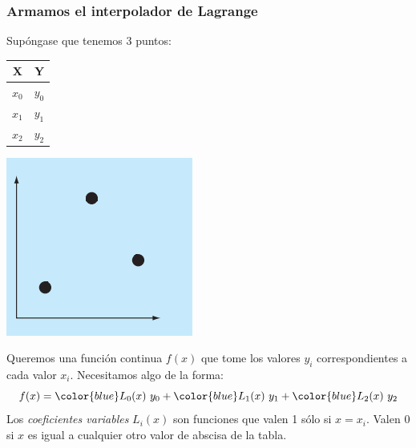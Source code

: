 \documentclass[11pt,xcolor={rgb}]{beamer}
\begin{document}
\begin{frame}[fragile=singleslide]
\frametitle{Armamos el interpolador de Lagrange}

Sup\'ongase que tenemos 3 puntos:

\begin{center}
\begin{multicols}{2}

	\begin{tabular}{c|c}
	X & Y\\	
	\hline
	$x_0$ & $y_0$\\
	$x_1$ & $y_1$\\
	$x_2$ & $y_2$
	\end{tabular}
	
	\includegraphics[scale=0.35]{puntos}

\end{multicols}
\end{center}

Queremos una funci\'on continua $f(x)$ que tome los valores $y_i$ correspondientes a cada valor $x_i$. Necesitamos algo de la forma:
$$f(x) = {\color{blue}L_0(x)}\ y_0 + {\color{blue}L_1(x)}\ y_1 + {\color{blue}L_2(x)}\ y_2$$
\linebreak
Los \textit{coeficientes variables} $L_i(x)$ son funciones que valen 1 s\'olo si $x = x_i$. Valen 0 si $x$ es igual a cualquier otro valor de abscisa de la tabla.

\end{frame}
\end{document}
